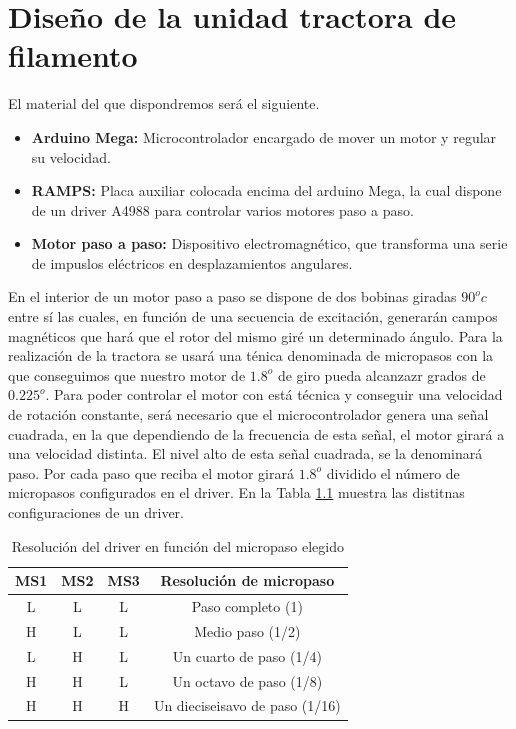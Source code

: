 
\chapter{Diseño de la unidad tractora de filamento}
\label{ane:tractora}
El material del que dispondremos será el siguiente.

\begin{itemize}
	\item{\textbf{Arduino Mega:} Microcontrolador encargado de mover un motor y regular su velocidad.}
	\item{\textbf{RAMPS:} Placa auxiliar colocada encima del arduino Mega, la cual dispone de un driver A4988 para controlar varios motores paso a paso.}
	\item{\textbf{Motor paso a paso:} Dispositivo electromagnético, que transforma una serie de impuslos eléctricos en desplazamientos angulares.}
\end{itemize}

En el interior de un motor paso a paso se dispone de dos bobinas giradas $90^oc$ entre sí \cite{pasoapaso} las cuales, en función de una secuencia de excitación, generarán campos magnéticos que hará que el rotor del mismo giré un determinado ángulo. Para la realización de la tractora se usará una ténica denominada de micropasos con la que conseguimos que nuestro motor de $1.8^o$ de giro pueda alcanzazr grados de $0.225^o$. Para poder controlar el motor con está técnica y conseguir una velocidad de rotación constante, será necesario que el microcontrolador genera una señal cuadrada, en la que dependiendo de la frecuencia de esta señal, el motor girará a una velocidad distinta. El nivel alto de esta señal cuadrada, se la denominará paso. Por cada paso que reciba el motor girará $1.8^o $ dividido el número de micropasos configurados en el driver. En la Tabla \ref{tab:res_drive} muestra las distitnas configuraciones de un driver.

\begin{table}[H]
    \centering
    \begin{tabular}{cccc}
        {\bf MS1} & {\bf MS2} & {\bf MS3} & {\bf Resolución de micropaso}  \\
        \hline
        L         & L         & L         & Paso completo (1)              \\
        H         & L         & L         & Medio paso (1/2)               \\
        L         & H         & L         & Un cuarto de paso (1/4)        \\
        H         & H         & L         & Un octavo de paso (1/8)        \\
        H         & H         & H         & Un dieciseisavo de paso (1/16)
    \end{tabular}
    \caption{Resolución del driver en función del micropaso elegido}
    \label{tab:res_drive}
\end{table}

